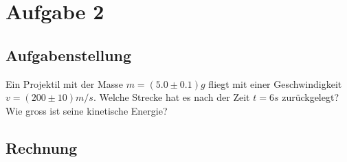 \section*{Aufgabe 2}
    \subsection*{Aufgabenstellung}
        Ein Projektil mit der Masse $m = (5.0 \pm 0.1)g$ fliegt mit einer Geschwindigkeit\\
        $v = (200 \pm 10)m/s$. Welche Strecke hat es nach der Zeit $t = 6 s$ zurückgelegt?\\
        Wie gross ist seine kinetische Energie?

    \subsection*{Rechnung}